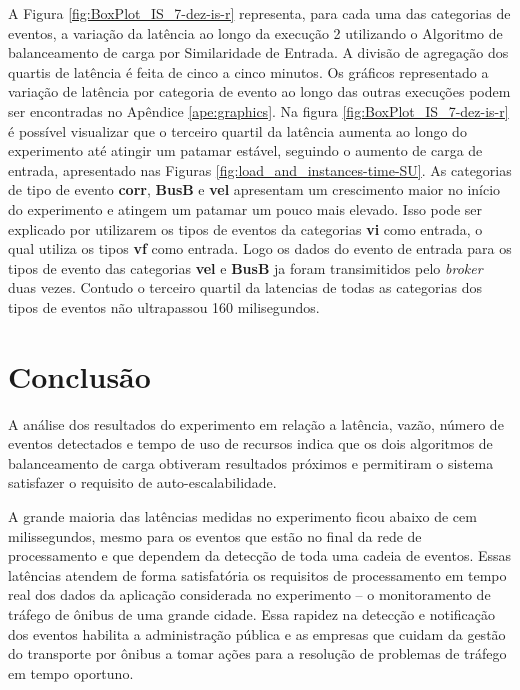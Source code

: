 A Figura \ref{fig:BoxPlot_IS_7-dez-is-r} representa, para cada uma das categorias de eventos, a variação da latência ao longo da execução 2 utilizando o Algoritmo de balanceamento de carga por Similaridade de Entrada. A divisão de agregação dos quartis de latência é feita de cinco a cinco minutos. Os gráficos representado a variação de latência por categoria de evento ao longo das outras execuções podem ser encontradas no Apêndice \ref{ape:graphics}. Na figura \ref{fig:BoxPlot_IS_7-dez-is-r} é possível visualizar que o terceiro quartil da latência aumenta ao longo do experimento até atingir um patamar estável, seguindo o aumento de carga de entrada, apresentado nas Figuras \ref{fig:load_and_instances-time-SU}. As categorias de tipo de evento \textbf{corr}, \textbf{BusB} e \textbf{vel} apresentam um crescimento maior no início do experimento e atingem um patamar um pouco mais elevado. Isso pode ser explicado por utilizarem os tipos de eventos da categorias \textbf{vi} como entrada, o qual utiliza os tipos \textbf{vf} como entrada. Logo os dados do evento de entrada para os tipos de evento das categorias \textbf{vel} e \textbf{BusB} ja foram transimitidos pelo \textit{broker} duas vezes. Contudo o terceiro quartil da latencias de todas as categorias dos tipos de eventos não ultrapassou 160 milisegundos. 




\section{Conclusão}


A análise dos resultados do experimento em relação a latência, vazão, número de eventos detectados e tempo de uso de recursos indica que os dois algoritmos de balanceamento de carga obtiveram resultados próximos e permitiram o sistema satisfazer o requisito de auto-escalabilidade. 


A grande maioria das latências medidas no experimento ficou abaixo de cem milissegundos, mesmo para os eventos que estão no final da rede de processamento e que dependem da detecção de toda uma cadeia de eventos. 
Essas latências atendem de forma satisfatória os requisitos de processamento em tempo real dos dados da aplicação considerada no experimento -- o monitoramento de tráfego de ônibus de uma grande cidade. Essa rapidez na detecção e notificação dos eventos habilita a administração pública e as empresas que cuidam da gestão do transporte por ônibus a tomar ações para a resolução de problemas de tráfego em tempo oportuno. 
  
